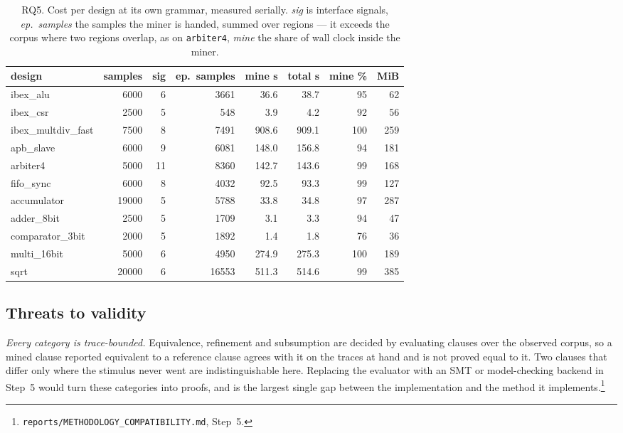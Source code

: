 \begin{table}[t]
\centering
\caption{RQ5. Cost per design at its own grammar, measured serially. \emph{sig} is interface
signals, \emph{ep.\ samples} the samples the miner is handed, summed over regions --- it
exceeds the corpus where two regions overlap, as on \texttt{arbiter4},
\emph{mine} the share of wall clock inside the miner.}
\label{tab:rq5}
\begin{tabular}{lrrrrrrr}
\toprule
design & samples & sig & ep.\ samples & mine s & total s & mine \% & MiB \\
\midrule
ibex\_alu & 6000 & 6 & 3661 & 36.6 & 38.7 & 95 & 62 \\
ibex\_csr & 2500 & 5 & 548 & 3.9 & 4.2 & 92 & 56 \\
ibex\_multdiv\_fast & 7500 & 8 & 7491 & 908.6 & 909.1 & 100 & 259 \\
apb\_slave & 6000 & 9 & 6081 & 148.0 & 156.8 & 94 & 181 \\
arbiter4 & 5000 & 11 & 8360 & 142.7 & 143.6 & 99 & 168 \\
fifo\_sync & 6000 & 8 & 4032 & 92.5 & 93.3 & 99 & 127 \\
accumulator & 19000 & 5 & 5788 & 33.8 & 34.8 & 97 & 287 \\
adder\_8bit & 2500 & 5 & 1709 & 3.1 & 3.3 & 94 & 47 \\
comparator\_3bit & 2000 & 5 & 1892 & 1.4 & 1.8 & 76 & 36 \\
multi\_16bit & 5000 & 6 & 4950 & 274.9 & 275.3 & 100 & 189 \\
sqrt & 20000 & 6 & 16553 & 511.3 & 514.6 & 99 & 385 \\
\bottomrule
\end{tabular}
\end{table}

\subsection{Threats to validity}
\label{sec:threats}
\emph{Every category is trace-bounded.} Equivalence, refinement and subsumption are decided
by evaluating clauses over the observed corpus, so a mined clause reported equivalent to a
reference clause agrees with it on the traces at hand and is not proved equal to it. Two
clauses that differ only where the stimulus never went are indistinguishable here. Replacing
the evaluator with an SMT or model-checking backend in Step~5 would turn these categories into
proofs, and is the largest single gap between the implementation and the method it
implements.\footnote{\texttt{reports/METHODOLOGY\_COMPATIBILITY.md}, Step~5.}

